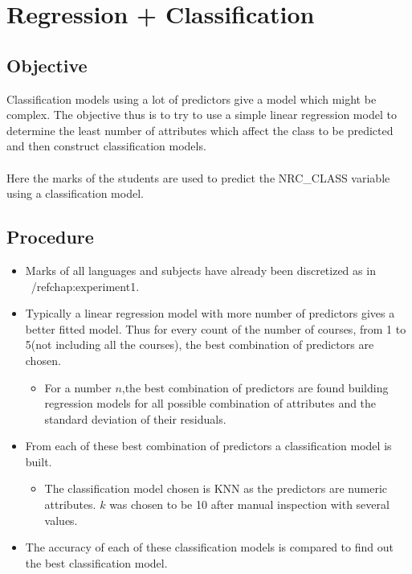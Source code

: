 \chapter{Regression + Classification}

\section*{Objective}
Classification models using a lot of predictors give a model which might be complex. The objective thus is to try to use a simple linear regression model to determine the least number of attributes which affect the class to be predicted and then construct classification models.
\\
\\
Here the marks of the students are used to predict the NRC{\_}CLASS variable using a classification model.

\section*{Procedure}
\begin{itemize}
\item Marks of all languages and subjects have already been discretized as in ~/ref{chap:experiment1}.
\item Typically a linear regression model with more number of predictors gives a better fitted model. Thus for every count of the number of courses, from 1 to 5(not including all the courses), the best combination of predictors are chosen.
\begin{itemize}
\item For a number $n$,the best combination of predictors are found building regression models for all possible combination of attributes and the standard deviation of their residuals.
\end{itemize}
\item From each of these best combination of predictors a classification model is built.
\begin{itemize}
\item The classification model chosen is KNN as the predictors are numeric attributes. $k$ was chosen to be 10 after manual inspection with several values.
\end{itemize}
\item The accuracy of each of these classification models is compared to find out the best classification model.
\end{itemize}

